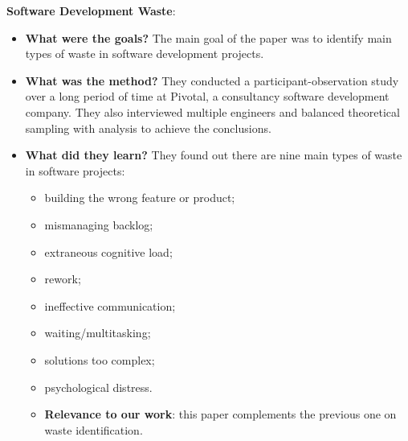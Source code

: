 \documentclass{mprop}
\begin{document}
\textbf{Software Development Waste}\cite{sedano2017software}:
\begin{itemize}
  \item \textbf{What were the goals?}
    The main goal of the paper was to identify main types of waste in software
    development projects.
  \item \textbf{What was the method?}
    They conducted a participant-observation study over a long period of time
    at Pivotal, a consultancy software development company. They also interviewed
    multiple engineers and balanced theoretical sampling with analysis to achieve
    the conclusions.
  \item \textbf{What did they learn?}
    They found out there are nine main types of waste in software projects:
    \begin{itemize}
      \item building the wrong feature or product;
      \item mismanaging backlog;
      \item extraneous cognitive load;
      \item rework;
      \item ineffective communication;
      \item waiting/multitasking;
      \item solutions too complex;
      \item psychological distress.
      \item \textbf{Relevance to our work}: this paper complements the previous 
    one on waste identification\cite{Korkala2014WasteIdentification}.
    \end{itemize}
\end{itemize}
\end{document}
